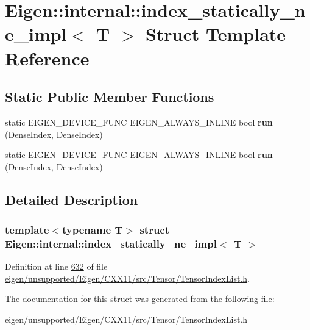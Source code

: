 \hypertarget{struct_eigen_1_1internal_1_1index__statically__ne__impl}{}\section{Eigen\+:\+:internal\+:\+:index\+\_\+statically\+\_\+ne\+\_\+impl$<$ T $>$ Struct Template Reference}
\label{struct_eigen_1_1internal_1_1index__statically__ne__impl}
\subsection*{Static Public Member Functions}
\begin{DoxyCompactItemize}
\item 
\mbox{\label{struct_eigen_1_1internal_1_1index__statically__ne__impl_a75f0f37b807d8b6e40a3567295815709}} 
static E\+I\+G\+E\+N\+\_\+\+D\+E\+V\+I\+C\+E\+\_\+\+F\+U\+NC E\+I\+G\+E\+N\+\_\+\+A\+L\+W\+A\+Y\+S\+\_\+\+I\+N\+L\+I\+NE bool {\bfseries run} (Dense\+Index, Dense\+Index)
\item 
\mbox{\label{struct_eigen_1_1internal_1_1index__statically__ne__impl_a75f0f37b807d8b6e40a3567295815709}} 
static E\+I\+G\+E\+N\+\_\+\+D\+E\+V\+I\+C\+E\+\_\+\+F\+U\+NC E\+I\+G\+E\+N\+\_\+\+A\+L\+W\+A\+Y\+S\+\_\+\+I\+N\+L\+I\+NE bool {\bfseries run} (Dense\+Index, Dense\+Index)
\end{DoxyCompactItemize}


\subsection{Detailed Description}
\subsubsection*{template$<$typename T$>$\newline
struct Eigen\+::internal\+::index\+\_\+statically\+\_\+ne\+\_\+impl$<$ T $>$}



Definition at line \hyperlink{eigen_2unsupported_2_eigen_2_c_x_x11_2src_2_tensor_2_tensor_index_list_8h_source_l00632}{632} of file \hyperlink{eigen_2unsupported_2_eigen_2_c_x_x11_2src_2_tensor_2_tensor_index_list_8h_source}{eigen/unsupported/\+Eigen/\+C\+X\+X11/src/\+Tensor/\+Tensor\+Index\+List.\+h}.



The documentation for this struct was generated from the following file\+:\begin{DoxyCompactItemize}
\item 
eigen/unsupported/\+Eigen/\+C\+X\+X11/src/\+Tensor/\+Tensor\+Index\+List.\+h\end{DoxyCompactItemize}
